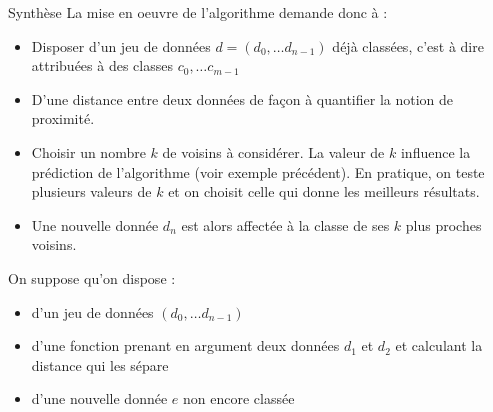 \documentclass[10pt]{beamer}
\begin{document}
\begin{frame}{\Ctitle}{\stitle}
    \begin{block}{Synthèse}
        La mise en oeuvre de l'algorithme demande donc à :
        \begin{itemize}
            \item<1-> Disposer d'un jeu de données $d=(d_0, \dots d_{n-1})$ déjà classées, c'est à dire attribuées à des classes $c_0, \dots c_{m-1}$
            \item<2-> D'une distance entre deux données de façon à quantifier la notion de proximité.
            \item<3-> Choisir un nombre $k$ de voisins à considérer. La valeur de $k$ influence la prédiction de l'algorithme (voir exemple précédent). En pratique, on teste plusieurs valeurs de $k$ et on choisit celle qui donne les meilleurs résultats.
            \item<4-> Une nouvelle donnée $d_n$ est alors affectée à la classe de ses $k$ plus proches voisins.
        \end{itemize}
    \end{block}
\end{frame}


\begin{frame}{\Ctitle}{\stitle}
    On suppose qu'on dispose :
    \begin{itemize}
        \item<2-> d'un jeu de données $(d_0, \dots d_{n-1})$
        \item<3-> d'une fonction  prenant en argument deux données $d_1$ et $d_2$ et calculant la distance qui les sépare
        \item<4-> d'une nouvelle donnée $e$ non encore classée
    \end{itemize}
    
\end{frame}
\end{document}
